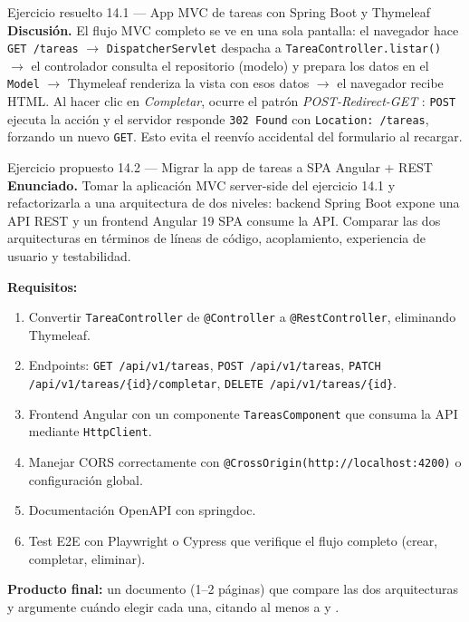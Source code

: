 \begin{cajaejemplo}{Ejercicio resuelto 14.1 --- App MVC de tareas con Spring Boot y Thymeleaf}
\textbf{Discusión.} El flujo MVC completo se ve en una sola pantalla:
el navegador hace \texttt{GET /tareas} $\to$
\texttt{DispatcherServlet} despacha a \texttt{TareaController.listar()}
$\to$ el controlador consulta el repositorio (modelo) y prepara los
datos en el \texttt{Model} $\to$ Thymeleaf renderiza la vista con esos
datos $\to$ el navegador recibe HTML. Al hacer clic en
\emph{Completar}, ocurre el patrón \emph{POST-Redirect-GET}
\cite{walls2022spring}: \texttt{POST} ejecuta la acción y el
servidor responde \texttt{302 Found} con \texttt{Location: /tareas},
forzando un nuevo \texttt{GET}. Esto evita el reenvío accidental del
formulario al recargar.
\end{cajaejemplo}

\begin{cajaejercicio}{Ejercicio propuesto 14.2 --- Migrar la app de tareas a SPA Angular + REST}
\textbf{Enunciado.} Tomar la aplicación MVC server-side del ejercicio
14.1 y refactorizarla a una arquitectura de dos niveles: backend Spring
Boot expone una API REST y un frontend Angular 19 SPA consume la API.
Comparar las dos arquitecturas en términos de líneas de código,
acoplamiento, experiencia de usuario y testabilidad.

\textbf{Requisitos:}
\begin{enumerate}
\item Convertir \texttt{TareaController} de \texttt{@Controller} a
\texttt{@RestController}, eliminando Thymeleaf.
\item Endpoints: \texttt{GET /api/v1/tareas},
\texttt{POST /api/v1/tareas}, \texttt{PATCH /api/v1/tareas/\{id\}/completar},
\texttt{DELETE /api/v1/tareas/\{id\}}.
\item Frontend Angular con un componente \texttt{TareasComponent}
que consuma la API mediante \texttt{HttpClient}.
\item Manejar CORS correctamente con
\texttt{@CrossOrigin(http://localhost:4200)} o configuración
global.
\item Documentación OpenAPI con springdoc.
\item Test E2E con Playwright o Cypress que verifique el flujo
completo (crear, completar, eliminar).
\end{enumerate}

\textbf{Producto final:} un documento (1--2 páginas) que compare las
dos arquitecturas y argumente cuándo elegir cada una, citando al
menos a \cite{galloway2011mvc} y \cite{richardson2007restful}.
\end{cajaejercicio}

